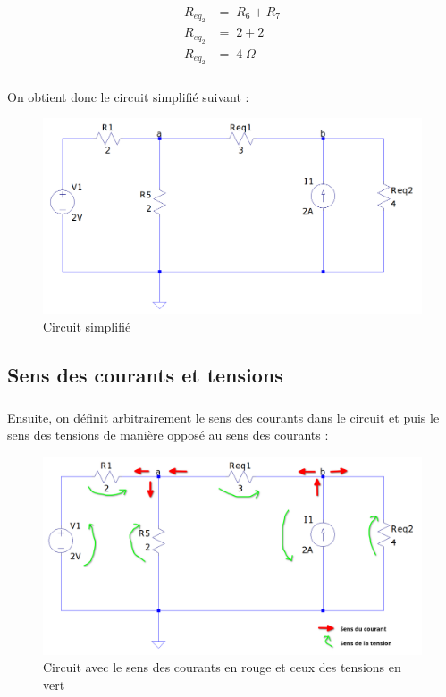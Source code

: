            \begin{align*}
                R_{eq_{2}}&=\; R_6 + R_7 \\
                R_{eq_{2}}&=\; 2 + 2 \\
                R_{eq_{2}}&=\; 4\;\Omega
            \end{align*}
            
        \subparagraph{}On obtient donc le circuit simplifié suivant :
        
            \begin{figure}[H]
                \centering
                \includegraphics[scale=0.4]{../pictures/simplifie.png}
                \caption{Circuit simplifié}
                \label{fig:simp}
            \end{figure}
    
    \subsection{Sens des courants et tensions}
        \subparagraph{}Ensuite, on définit arbitrairement le sens des courants dans le circuit et puis le sens des tensions de manière opposé au sens des courants :
                \begin{figure}[H]
                    \centering
                    \includegraphics[scale=0.4]{../pictures/sens.png}
                    \caption{Circuit avec le sens des courants en rouge et ceux des tensions en vert}
                    \label{fig:sens}
                \end{figure}
                
